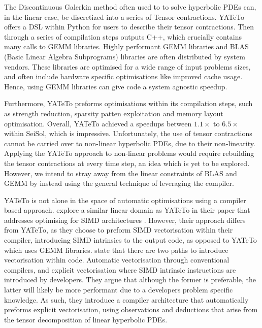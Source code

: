 The Discontinuous Galerkin method often used to to solve hyperbolic PDEs can, in the linear case, be discretized into a series of Tensor contractions.
YATeTo offers a DSL within Python for users to describe their tensor contractions.
Then through a series of compilation steps outputs C++, which crucially contains many calls to GEMM libraries.
Highly performant GEMM libraries and BLAS (Basic Linear Algebra Subprograms) libraries are often distributed by system vendors.
These libraries are optimised for a wide range of input problems sizes, and often include hardware specific optimisations like improved cache usage.
Hence, using GEMM libraries can give code a system agnostic speedup.

Furthermore, YATeTo preforms optimisations within its compilation steps, such as strength reduction, sparsity patten exploitation and memory layout optimisation.
Overall, YATeTo achieved a speedups between $1.1\times$ to $6.5 \times$ within SeiSol, which is impressive.
Unfortunately, the use of tensor contractions cannot be carried over to non-linear hyperbolic PDEs, due to their non-linearity.
Applying the YATeTo approach to non-linear problems would require rebuilding the tensor contractions at every time step, an idea which is yet to be explored.
However, we intend to stray away from the linear constraints of BLAS and GEMM by instead using the general technique of leveraging the compiler.   





YATeTo is not alone in the space of automatic optimisations using a compiler based approach.
\citeauthor{codegen_dg_SIMD} explore a similar linear domain as YATeTo in their paper that addresses optimising for SIMD architectures \cite{codegen_dg_SIMD}. 
However, their approach differs from YATeTo, as they choose to preform SIMD vectorisation within their compiler, introducing SIMD intrinsics to the output code, as opposed to YATeTo which uses GEMM libraries.
\citeauthor{codegen_dg_SIMD} state that there are two paths to introduce vectorisation within code.
Automatic vectorisation through conventional compilers, and explicit vectorisation where SIMD intrinsic instructions are introduced by developers.
They argue that although the former is preferable, the latter will likely be more performant due to a developers problem specific knowledge.
As such, they introduce a compiler architecture that automatically preforms explicit vectorisation, using observations and deductions that arise from the tensor decomposition of linear hyperbolic PDEs.

